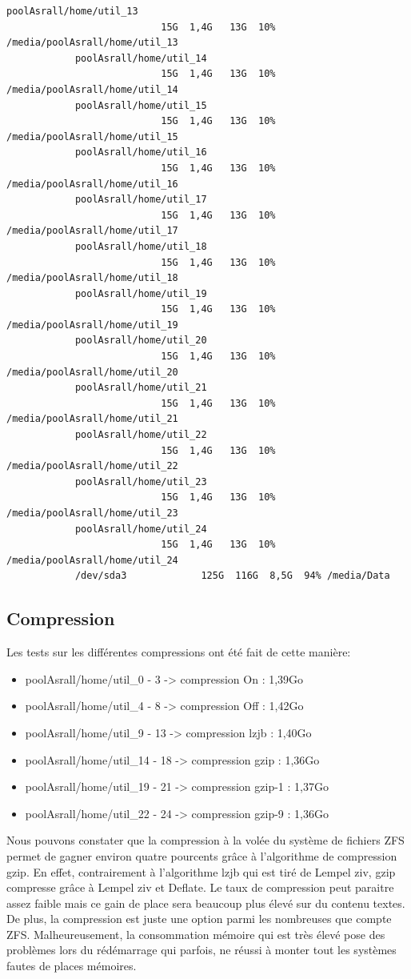 \documentclass[a4paper]{report}
\begin{document}
\begin{lstlisting}[backgroundcolor=\color{yellow}]
			poolAsrall/home/util_13
					       15G  1,4G   13G  10% /media/poolAsrall/home/util_13
			poolAsrall/home/util_14
					       15G  1,4G   13G  10% /media/poolAsrall/home/util_14
			poolAsrall/home/util_15
					       15G  1,4G   13G  10% /media/poolAsrall/home/util_15
			poolAsrall/home/util_16
					       15G  1,4G   13G  10% /media/poolAsrall/home/util_16
			poolAsrall/home/util_17
					       15G  1,4G   13G  10% /media/poolAsrall/home/util_17
			poolAsrall/home/util_18
					       15G  1,4G   13G  10% /media/poolAsrall/home/util_18
			poolAsrall/home/util_19
					       15G  1,4G   13G  10% /media/poolAsrall/home/util_19
			poolAsrall/home/util_20
					       15G  1,4G   13G  10% /media/poolAsrall/home/util_20
			poolAsrall/home/util_21
					       15G  1,4G   13G  10% /media/poolAsrall/home/util_21
			poolAsrall/home/util_22
					       15G  1,4G   13G  10% /media/poolAsrall/home/util_22
			poolAsrall/home/util_23
					       15G  1,4G   13G  10% /media/poolAsrall/home/util_23
			poolAsrall/home/util_24
					       15G  1,4G   13G  10% /media/poolAsrall/home/util_24
			/dev/sda3             125G  116G  8,5G  94% /media/Data

		\end{lstlisting}
		\subsection{Compression}
			Les tests sur les différentes compressions ont été fait de cette manière:
			\begin{itemize}
				\item poolAsrall/home/util\_0 - 3 -> compression On : 1,39Go
				\item poolAsrall/home/util\_4 - 8 -> compression Off : 1,42Go
				\item poolAsrall/home/util\_9 - 13 -> compression lzjb : 1,40Go
				\item poolAsrall/home/util\_14 - 18 -> compression gzip : 1,36Go
				\item poolAsrall/home/util\_19 - 21 -> compression gzip-1 : 1,37Go
				\item poolAsrall/home/util\_22 - 24 -> compression gzip-9 : 1,36Go \\
			\end{itemize}
			Nous pouvons constater que la compression à la volée du système de fichiers ZFS permet de gagner environ quatre pourcents grâce à l'algorithme de compression gzip. En effet, contrairement à l'algorithme lzjb qui est tiré de Lempel ziv, gzip compresse grâce à Lempel ziv et Deflate. Le taux de compression peut paraitre assez faible mais ce gain de place sera beaucoup plus élevé sur du contenu textes. De plus, la compression est juste une option parmi les nombreuses que compte ZFS. Malheureusement, la consommation mémoire qui est très élevé pose des problèmes lors du rédémarrage qui parfois, ne réussi à monter tout les systèmes fautes de places mémoires.
\end{document}
